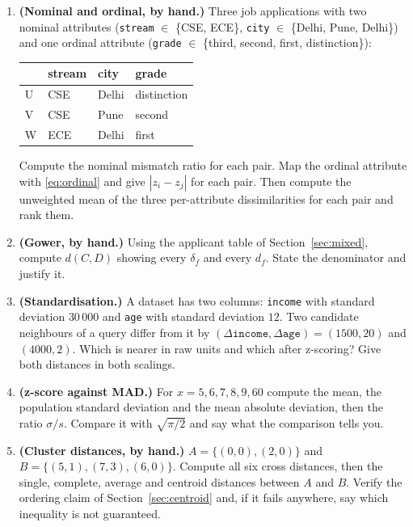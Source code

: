 \documentclass[11pt]{article}
\begin{document}
\begin{enumerate}[leftmargin=*]
  \item \textbf{(Nominal and ordinal, by hand.)} Three job applications with
    two nominal attributes (\texttt{stream} $\in$ \{CSE, ECE\},
    \texttt{city} $\in$ \{Delhi, Pune, Delhi\}) and one ordinal attribute
    (\texttt{grade} $\in$ \{third, second, first, distinction\}):
    \begin{center}
    \begin{tabular}{llll}
      \toprule
      & stream & city & grade \\ \midrule
      U & CSE & Delhi & distinction \\
      V & CSE & Pune  & second \\
      W & ECE & Delhi & first \\ \bottomrule
    \end{tabular}
    \end{center}
    Compute the nominal mismatch ratio for each pair. Map the ordinal
    attribute with \eqref{eq:ordinal} and give $|z_i - z_j|$ for each pair.
    Then compute the unweighted mean of the three per-attribute
    dissimilarities for each pair and rank them.

  \item \textbf{(Gower, by hand.)} Using the applicant table of
    Section~\ref{sec:mixed}, compute $d(C,D)$ showing every $\delta_f$ and
    every $d_f$. State the denominator and justify it.

  \item \textbf{(Standardisation.)} A dataset has two columns: \texttt{income}
    with standard deviation $30\,000$ and \texttt{age} with standard
    deviation $12$. Two candidate neighbours of a query differ from it by
    $(\Delta\texttt{income}, \Delta\texttt{age}) = (1500, 20)$ and
    $(4000, 2)$. Which is nearer in raw units and which after z-scoring?
    Give both distances in both scalings.

  \item \textbf{(z-score against MAD.)} For $x = 5, 6, 7, 8, 9, 60$ compute
    the mean, the population standard deviation and the mean absolute
    deviation, then the ratio $\sigma/s$. Compare it with $\sqrt{\pi/2}$ and
    say what the comparison tells you.

  \item \textbf{(Cluster distances, by hand.)} $A = \{(0,0), (2,0)\}$ and
    $B = \{(5,1), (7,3), (6,0)\}$. Compute all six cross distances, then the
    single, complete, average and centroid distances between $A$ and $B$.
    Verify the ordering claim of Section~\ref{sec:centroid} and, if it fails
    anywhere, say which inequality is not guaranteed.


\end{enumerate}
\end{document}

